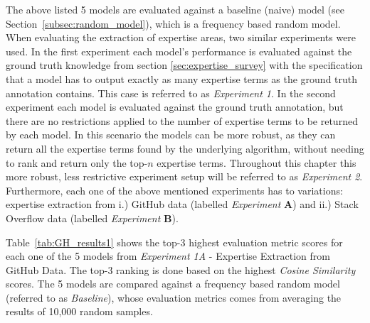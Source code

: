         The above listed 5 models are evaluated against a baseline (naive) model (see Section~\ref{subsec:random_model}), which is a frequency based random model. When evaluating the extraction of expertise areas, two similar experiments were used. In the first experiment each model's performance is evaluated against the ground truth knowledge from section \ref{sec:expertise_survey} with the specification that a model has to output exactly as many expertise terms as the ground truth annotation contains. This case is referred to as \emph{Experiment 1}. In the second experiment each model is evaluated against the ground truth annotation, but there are no restrictions applied to the number of expertise terms to be returned by each model. In this scenario the models can be more robust, as they can return all the expertise terms found by the underlying algorithm, without needing to rank and return only the top-$n$ expertise terms. Throughout this chapter this more robust, less restrictive experiment setup will be referred to as \emph{Experiment 2}. Furthermore, each one of the above mentioned experiments has to variations: expertise extraction from i.) GitHub data (labelled \emph{Experiment} \textbf{A}) and ii.) Stack Overflow data (labelled \emph{Experiment} \textbf{B}). 
        
        Table~\ref{tab:GH_results1} shows the top-$3$ highest evaluation metric scores for each one of the 5 models from \emph{Experiment 1A} - Expertise Extraction from GitHub Data. The top-$3$ ranking is done based on the highest \emph{Cosine Similarity} scores. The 5 models are compared against a frequency based random model (referred to as \emph{Baseline}), whose evaluation metrics comes from averaging the results of 10,000 random samples.
        
